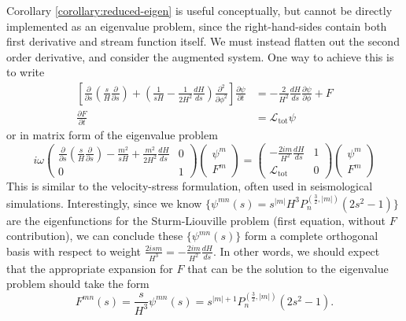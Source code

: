 Corollary \ref{corollary:reduced-eigen} is useful conceptually, but cannot be directly implemented as an eigenvalue problem, since the right-hand-sides contain both first derivative and stream function itself. We must instead flatten out the second order derivative, and consider the augmented system. One way to achieve this is to write
\[\begin{aligned}
    \left[\frac{\partial}{\partial s}\left(\frac{s}{H}\frac{\partial}{\partial s}\right) + \left(\frac{1}{sH} - \frac{1}{2H^2} \frac{dH}{ds}\right)\frac{\partial^2}{\partial \phi^2}\right] \frac{\partial \psi}{\partial t} &= - \frac{2}{H^2}\frac{dH}{ds} \frac{\partial \psi}{\partial \phi} + F \\ 
    \frac{\partial F}{\partial t} &= \mathcal{L}_\mathrm{tot} \psi
\end{aligned}\]
or in matrix form of the eigenvalue problem
\[
i\omega \begin{pmatrix}
    \frac{\partial}{\partial s}\left(\frac{s}{H}\frac{\partial}{\partial s}\right) - \frac{m^2}{sH} + \frac{m^2}{2H^2} \frac{dH}{ds} & 0 \\ 
    0 & 1
\end{pmatrix} \begin{pmatrix} \psi^m \\ F^m \end{pmatrix} = \begin{pmatrix} -\frac{2im}{H^2} \frac{dH}{ds} & 1 \\ \mathcal{L}_\mathrm{tot} & 0 \end{pmatrix} \begin{pmatrix}
    \psi^m \\ F^m
\end{pmatrix}
\]
This is similar to the velocity-stress formulation, often used in seismological simulations. Interestingly, since we know $\{\psi^{mn}(s) = s^{|m|}H^3 P_{n}^{(\frac{3}{2}, |m|)}(2s^2 - 1)\}$ are the eigenfunctions for the Sturm-Liouville problem (first equation, without $F$ contribution), we can conclude these $\{\psi^{mn}(s)\}$ form a complete orthogonal basis with respect to weight $\frac{2ism}{H^3} = -\frac{2im}{H^2}\frac{dH}{ds}$. In other words, we should expect that the appropriate expansion for $F$ that can be the solution to the eigenvalue problem should take the form
\[F^{mn}(s) = \frac{s}{H^3} \psi^{mn}(s) = s^{|m|+1} P_n^{(\frac{3}{2},|m|)}(2s^2 - 1).\]

